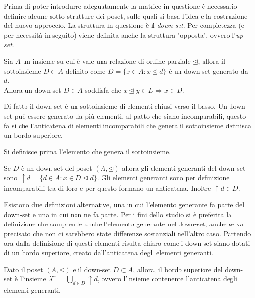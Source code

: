 \documentclass{report}
\begin{document}
Prima di poter introdurre adeguatamente la matrice in questione è necessario definire alcune sotto-strutture dei poset, sulle quali si basa l'idea e la costruzione del nuovo approccio.
La struttura in questione è il \textit{down-set}. Per completezza (e per necessità in seguito) viene definita anche la struttura "opposta", ovvero l'\textit{up-set}.

\begin{definition}
Sia $A$ un insieme su cui è vale una relazione di ordine parziale $\unlhd$, allora il sottoinsieme $D \subset A$ definito come $D=\{x\in A:x\unlhd d\}$ è un down-set generato da $d$.\\
Allora un down-set $D \in A$ soddisfa che $x\unlhd y\in D\Rightarrow x\in D$.
\end{definition}

Di fatto il down-set è un sottoinsieme di elementi chiusi verso il basso. Un down-set può essere generato da più elementi, al patto che siano incomparabili, questo fa si che l'anticatena di elementi incomparabili che genera il sottoinsieme definisca un bordo superiore.

Si definisce prima l'elemento che genera il sottoinsieme.

\begin{definition}
Se $D$ è un down-set del poset $(A,\unlhd)$ allora gli elementi generanti del down-set sono $\uparrow d=\{d\in A:x\in D\unlhd d\}$. Gli elementi generanti sono per definizione incomparabili tra di loro e per questo formano un anticatena. Inoltre $\uparrow d\in D$.
\end{definition}

Esistono due definizioni alternative, una in cui l'elemento generante fa parte del down-set e una in cui non ne fa parte. Per i fini dello studio si è preferita la definizione che comprende anche l'elemento generante nel down-set, anche se va precisato che non ci sarebbero state differenze sostanziali nell'altro caso.
Partendo ora dalla definizione di questi elementi risulta chiaro come i down-set siano dotati di un bordo superiore, creato dall'anticatena degli elementi generanti.

\begin{definition}
Dato il poset $(A,\unlhd)$ e il down-set $D\subset A$, allora, il bordo superiore del down-set è l'insieme $X^{\uparrow}=\bigcup_{d\in D} \uparrow d$, ovvero l'insieme contenente l'anticatena degli elementi generanti.
\end{definition}
\end{document}
